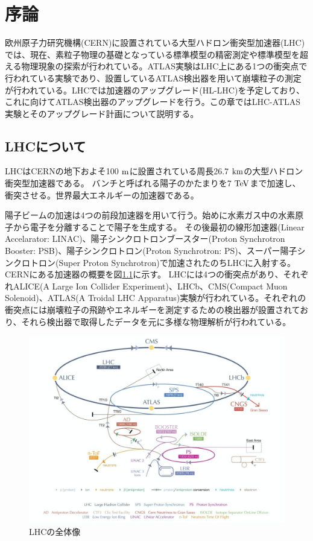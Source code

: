 \chapter{序論}
欧州原子力研究機構(CERN)に設置されている大型ハドロン衝突型加速器(LHC)では、現在、素粒子物理の基礎となっている標準模型の精密測定や標準模型を超える物理現象の探索が行われている。ATLAS実験はLHC上にある1つの衝突点で行われている実験であり、設置しているATLAS検出器を用いて崩壊粒子の測定が行われている。LHCでは加速器のアップグレード(HL-LHC)を予定しており、これに向けてATLAS検出器のアップグレードを行う。この章ではLHC-ATLAS実験とそのアップグレード計画について説明する。

\section{LHCについて}
LHCはCERNの地下およそ100 $\rm{m}$に設置されている周長26.7 $\rm{km}$の大型ハドロン衝突型加速器である。
バンチと呼ばれる陽子のかたまりを7 $\rm{TeV}$まで加速し、衝突させる。世界最大エネルギーの加速器である。

陽子ビームの加速は4つの前段加速器を用いて行う。始めに水素ガス中の水素原子から電子を分離することで陽子を生成する。
その後最初の線形加速器(Linear Accelarator: LINAC)、陽子シンクロトロンブースター(Proton Synchrotron Booster: PSB)、陽子シンクロトロン(Proton Synchrotron: PS)、スーパー陽子シンクロトロン(Super Proton Synchrotron)で加速されたのちLHCに入射する。CERNにある加速器の概要を図\ref{LHC_overview}に示す。
LHCには4つの衝突点があり、それぞれALICE(A Large Ion Collider Experiment)、LHCb、CMS(Compact Muon Solenoid)、ATLAS(A
Troidal LHC Apparatus)実験が行われている。それぞれの衝突点には崩壊粒子の飛跡やエネルギーを測定するための検出器が設置されており、それら検出器で取得したデータを元に多様な物理解析が行われている。

\begin{figure}[bpt]\centering
\includegraphics[width=12cm]{LHC_overview}
\caption[LHCの全体像]{LHCの全体像\cite{1-1}}
\label{LHC_overview}
\end{figure}

